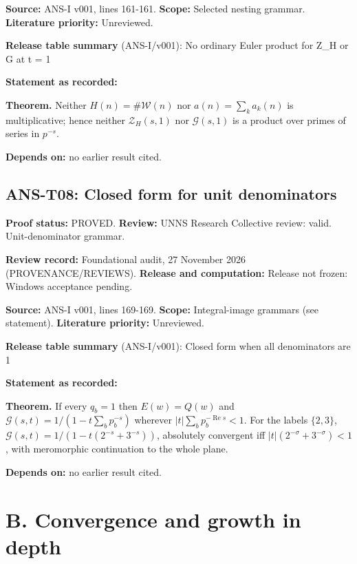 \documentclass[
  11pt,
]{article}
\begin{document}
\textbf{Source:} ANS-I v001, lines 161-161. \textbf{Scope:} Selected
nesting grammar. \textbf{Literature priority:} Unreviewed.

\textbf{Release table summary} (ANS-I/v001): No ordinary Euler product
for Z\_H or G at t = 1

\textbf{Statement as recorded:}

\textbf{Theorem.} Neither \(H(n)=\#\mathcal W(n)\) nor
\(a(n)=\sum_ka_k(n)\) is multiplicative; hence neither
\(\mathcal Z_H(s,1)\) nor \(\mathcal G(s,1)\) is a product over primes
of series in \(p^{-s}\).

\textbf{Depends on:} no earlier result cited.

\hypertarget{ans-t08-closed-form-for-unit-denominators}{%
\subsection{ANS-T08: Closed form for unit
denominators}\label{ans-t08-closed-form-for-unit-denominators}}

\textbf{Proof status:} PROVED. \textbf{Review:} UNNS Research Collective
review: valid. Unit-denominator grammar.

\textbf{Review record:} Foundational audit, 27 November 2026
(PROVENANCE/REVIEWS). \textbf{Release and computation:} Release not
frozen: Windows acceptance pending.

\textbf{Source:} ANS-I v001, lines 169-169. \textbf{Scope:}
Integral-image grammars (see statement). \textbf{Literature priority:}
Unreviewed.

\textbf{Release table summary} (ANS-I/v001): Closed form when all
denominators are 1

\textbf{Statement as recorded:}

\textbf{Theorem.} If every \(q_b=1\) then \(E(w)=Q(w)\) and
\(\mathcal G(s,t)=1/(1-t\sum_bp_b^{-s})\) wherever
\(|t|\sum_bp_b^{-\operatorname{Re}s}<1\). For the labels \(\{2,3\}\),
\(\mathcal G(s,t)=1/(1-t(2^{-s}+3^{-s}))\), absolutely convergent iff
\(|t|(2^{-\sigma}+3^{-\sigma})<1\), with meromorphic continuation to the
whole plane.

\textbf{Depends on:} no earlier result cited.

\hypertarget{b.-convergence-and-growth-in-depth}{%
\section{B. Convergence and growth in
depth}\label{b.-convergence-and-growth-in-depth}}
\end{document}
